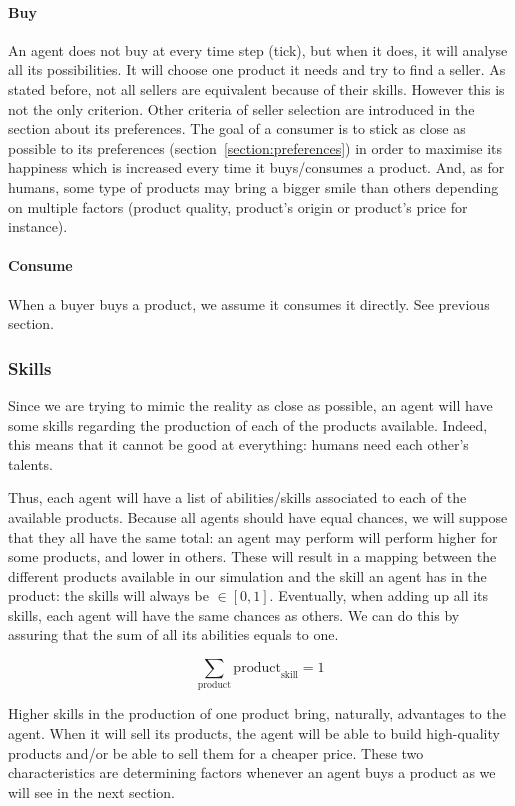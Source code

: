\documentclass[12pt]{article}
\begin{document}
\paragraph{Buy} 
An agent does not buy at every time step (tick), but when it does, it will analyse all its possibilities. It will choose one product it needs and try to find a seller. As stated before, not all sellers are equivalent because of their skills. However this is not the only criterion. Other criteria of seller selection are introduced in the section about its preferences. The goal of a consumer is to stick as close as possible to its preferences (section~\ref{section:preferences}) in order to maximise its happiness which is increased every time it buys/consumes a product. And, as for humans, some type of products may bring a bigger smile than others depending on multiple factors (product quality, product's origin or product's price for instance).

\paragraph{Consume}
When a buyer buys a product, we assume it consumes it directly. See previous section.

\subsubsection{Skills}\label{section:skills}
Since we are trying to mimic the reality as close as possible, an agent will have some skills regarding the production of each of the products available. Indeed, this means that it cannot be good at everything: humans need each other's talents.

Thus, each agent will have a list of abilities/skills associated to each of the available products. Because all agents should have equal chances, we will suppose that they all have the same total: an agent may perform will perform higher for some products, and lower in others. These will result in a mapping between the different products available in our simulation and the skill an agent has in the product: the skills will always be $\in [0, 1]$. Eventually, when adding up all its skills, each agent will have the same chances as others. We can do this by assuring that the sum of all its abilities equals to one.

$$\sum_{\text{product}} \text{product}_{\text{skill}} = 1$$

Higher skills in the production of one product bring, naturally, advantages to the agent. When it will sell its products, the agent will be able to build high-quality products and/or be able to sell them for a cheaper price. These two characteristics are determining factors whenever an agent buys a product as we will see in the next section.
\end{document}
